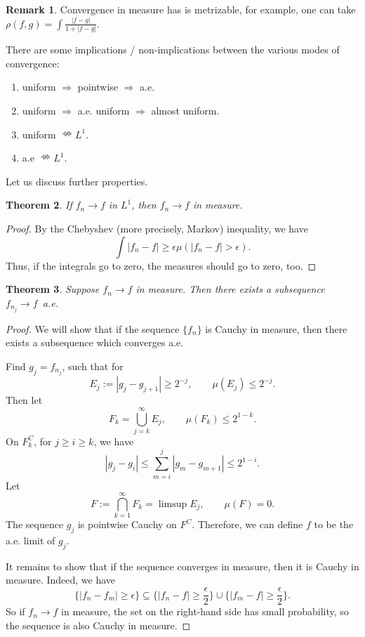 \documentclass{article}
\newtheorem{theorem}{Theorem}[section]
\theoremstyle{definition}
\newtheorem{remark}[theorem]{Remark}
\begin{document}
\begin{remark}
		Convergence in measure has is metrizable, for example, one can take
			$\rho(f,g)=\int \frac{|f-g|}{1+|f-g|}$.
\end{remark}

There are some implications / non-implications between the various modes of convergence:
\begin{enumerate}[1.]
	\item uniform $\Rightarrow$ pointwise $\Rightarrow$ a.e.
	\item uniform $\Rightarrow$ a.e. uniform $\Rightarrow$ almost uniform.
	\item uniform $\nLeftrightarrow L^1$.
	\item a.e $\nLeftrightarrow L^1$.
\end{enumerate}
Let us discuss further properties.
\begin{theorem}
	If $f_n \rightarrow f$ in $L^1$, then $f_n \rightarrow f$ in measure.
\end{theorem}
\begin{proof}
	By the Chebyshev (more precisely,
	Markov) inequality, we have
	$$\int |f_n-f| \geq \epsilon \mu(|f_n-f|>\epsilon).$$
	Thus, if the integrals go to zero, the measures
	should go to zero, too.
\end{proof}

\begin{theorem}
	Suppose $f_n \rightarrow f$ in measure. Then there exists a subsequence
	$f_{n_j}\rightarrow f$~a.e.
\end{theorem}
\begin{proof}
	We will show that if 
	the sequence $\{f_n\}$ is Cauchy in measure,
	then there exists a subsequence which converges a.e.
	
	Find $g_j=f_{n_j}$, such that for $$E_j:={|g_j-g_{j+1}|\geq 2^{-j}},\qquad  \mu(E_j)\leq 2^{-j}.$$
	Then let 
	\begin{equation*}
		F_k=\bigcup_{j = k}^{\infty} E_j,\qquad 
		\mu(F_k)\leq 2^{1-k}.
	\end{equation*}
	On $F_{k}^C$, for $j\ge i\ge k$, we have
	\begin{equation*}
		|g_j-g_i|\leq \sum_{m=i}^{j}|g_m-g_{m+1}|\leq 2^{1-i}.
	\end{equation*}
	Let 
	$$F:=\bigcap_{k=1}^{\infty}F_k=\limsup E_j,\qquad  \mu(F)=0.$$
	The sequence $g_j$ is pointwise Cauchy on $F^C$.
	Therefore, we can define $f$ to be the a.e. limit of 
	$g_j$.
	
	It remains to show that if the sequence converges in measure,
	then it is Cauchy in measure. Indeed, we have
	\begin{equation*}
		\{|f_n-f_m|\geq \epsilon \} \subseteq \{|f_n-f|\geq 
		\frac{\epsilon}{2}\}\cup \{|f_m-f|\geq \frac{\epsilon}{2} \}. 
	\end{equation*}
	So if $f_n\rightarrow f $ in measure, the set on the right-hand side 
	has small probability, so the sequence is also Cauchy in measure.
\end{proof}
\end{document}
